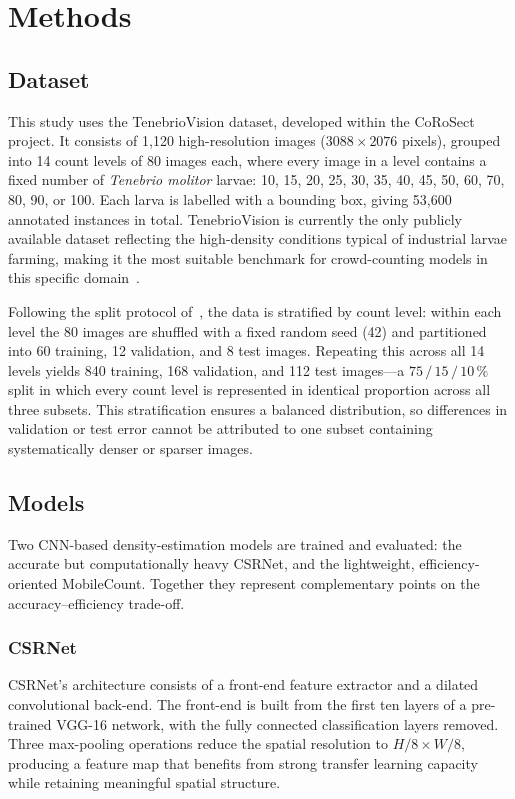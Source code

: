 \documentclass[conference]{IEEEtran}
\begin{document}
\section{Methods}
\subsection{Dataset}
This study uses the TenebrioVision dataset, developed within the CoRoSect
project. It consists of 1{,}120 high-resolution images ($3088 \times 2076$
pixels), grouped into 14 count levels of 80 images each, where every image in a
level contains a fixed number of \textit{Tenebrio molitor} larvae: 10, 15, 20,
25, 30, 35, 40, 45, 50, 60, 70, 80, 90, or 100. Each larva is labelled with a
bounding box, giving 53{,}600 annotated instances in total. TenebrioVision is
currently the only publicly available dataset reflecting the high-density
conditions typical of industrial larvae farming, making it the most suitable
benchmark for crowd-counting models in this specific
domain~\cite{Papadopoulos2024TenebrioVision}.

Following the split protocol of~\cite{Papadopoulos2024TenebrioVision}, the data
is stratified by count level: within each level the 80 images are shuffled with
a fixed random seed (42) and partitioned into 60 training, 12 validation, and 8
test images. Repeating this across all 14 levels yields 840 training, 168
validation, and 112 test images---a $75\,/\,15\,/\,10\,\%$ split in which every
count level is represented in identical proportion across all three subsets.
This stratification ensures a balanced distribution, so differences in
validation or test error cannot be attributed to one subset containing
systematically denser or sparser images.

\subsection{Models}
Two CNN-based density-estimation models are trained and evaluated: the accurate but computationally heavy CSRNet, and the lightweight, efficiency-oriented MobileCount. Together they represent complementary points on the accuracy–efficiency trade-off.

\subsubsection{CSRNet}
CSRNet's architecture consists of a front-end feature extractor and a dilated
convolutional back-end. The front-end is built from the first ten layers of a
pre-trained VGG-16 network, with the fully connected classification layers
removed. Three max-pooling operations reduce the spatial resolution to
$H/8 \times W/8$, producing a feature map that benefits from strong transfer
learning capacity while retaining meaningful spatial structure.
\end{document}

